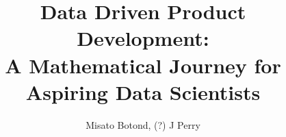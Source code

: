 \documentclass[openany]{book}
\begin{document}
\title{Data Driven Product Development: \\ \large A Mathematical Journey for Aspiring Data Scientists}
\author{Misato Botond, (?) J Perry}
\date{}
\maketitle

\tableofcontents





















\printindex
\end{document}
